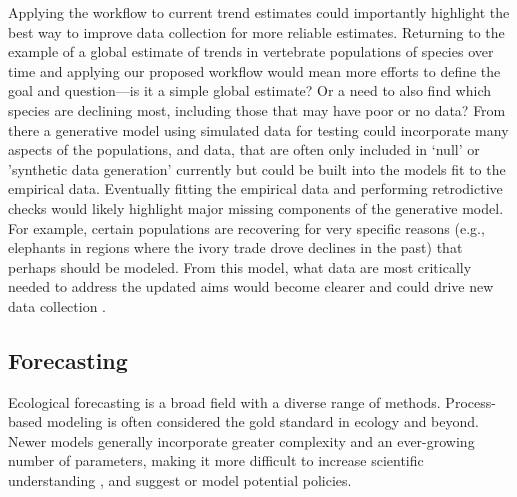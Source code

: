 \documentclass[11pt]{article}
\begin{document}
Applying the workflow to current trend estimates could importantly highlight the best way to improve data collection for more reliable estimates. Returning to the example of a global estimate of trends in vertebrate populations of species over time and applying our proposed workflow would mean more efforts to define the goal and question---is it a simple global estimate? Or a need to also find which species are declining most, including those that may have poor or no data? From there a generative model using simulated data for testing could incorporate many aspects of the populations, and data, that are often only included in `null' or 'synthetic data generation' currently \citep{Buschke2021,mcrae2025utility} but could be built into the models fit to the empirical data. Eventually fitting the empirical data and performing retrodictive checks would likely highlight major missing components of the generative model. For example, certain populations are recovering for very specific reasons (e.g., elephants in regions where the ivory trade drove declines in the past) that perhaps should be modeled. From this model, what data are most critically needed to address the updated aims would become clearer and could drive new data collection \citep{toszogyova2024mathematical}. 

\subsection{Forecasting}

Ecological forecasting is a broad field with a diverse range of methods. Process-based modeling is often considered the gold standard in ecology \citep{Urban2016, Pilowsky2022} and beyond. Newer models generally incorporate greater complexity and an ever-growing number of parameters, making it more difficult to increase scientific understanding \citep{Franklin2020}, and suggest or model potential policies. 
\end{document}
